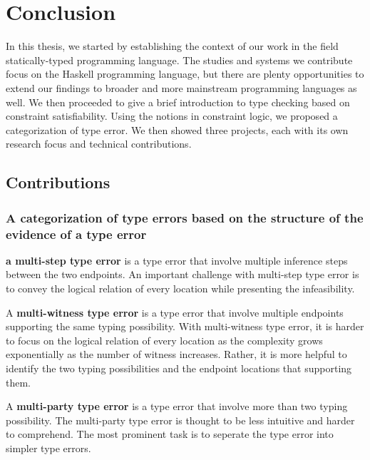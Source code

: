 

\chapter{Conclusion}

\label{chap:conclusion} 



\graphicspath{{Figures/Conclusion}}

In this thesis, we started by establishing the context of our work in the field statically-typed programming language. The studies and systems we contribute focus on the Haskell programming language, but there are plenty opportunities to extend our findings to broader and more mainstream programming languages as well. We then proceeded to give a brief introduction to type checking based on constraint satisfiability. Using the notions in constraint logic, we proposed a categorization of type error. We then showed three projects, each with its own research focus and technical contributions.


\section{Contributions}


\subsection{A categorization of type errors based on the structure of the evidence of a type error}

\textbf{a multi-step type error} is a type error that involve multiple inference steps between the two endpoints. An important challenge with multi-step type error is to convey the logical relation of every location while presenting the infeasibility. 

A \textbf{multi-witness type error} is a type error that involve multiple endpoints supporting the same typing possibility. With multi-witness type error, it is harder to focus on the logical relation of every location as the complexity grows exponentially as the number of witness increases. Rather, it is more helpful to identify the two typing possibilities and the endpoint locations that supporting them.

A \textbf{multi-party type error} is a type error that involve more than two typing possibility. The multi-party type error is thought to be less intuitive and harder to comprehend. The most prominent task is to seperate the type error into simpler type errors. 


